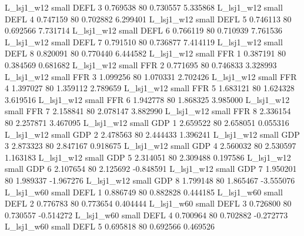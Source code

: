     L_lsj1_w12      small     DEFL                 3 0.769538 80       0.730557           5.335868
    L_lsj1_w12      small     DEFL                 4 0.747159 80       0.702882           6.299401
    L_lsj1_w12      small     DEFL                 5 0.746113 80       0.692566           7.731714
    L_lsj1_w12      small     DEFL                 6 0.766119 80       0.710939           7.761536
    L_lsj1_w12      small     DEFL                 7 0.791510 80       0.736877           7.414119
    L_lsj1_w12      small     DEFL                 8 0.820091 80       0.770440           6.444582
    L_lsj1_w12      small      FFR                 1 0.387191 80       0.384569           0.681682
    L_lsj1_w12      small      FFR                 2 0.771695 80       0.746833           3.328993
    L_lsj1_w12      small      FFR                 3 1.099256 80       1.070331           2.702426
    L_lsj1_w12      small      FFR                 4 1.397027 80       1.359112           2.789659
    L_lsj1_w12      small      FFR                 5 1.683121 80       1.624328           3.619516
    L_lsj1_w12      small      FFR                 6 1.942778 80       1.868325           3.985000
    L_lsj1_w12      small      FFR                 7 2.158841 80       2.078147           3.882990
    L_lsj1_w12      small      FFR                 8 2.336154 80       2.257871           3.467095
    L_lsj1_w12      small      GDP                 1 2.659522 80       2.658051           0.055316
    L_lsj1_w12      small      GDP                 2 2.478563 80       2.444433           1.396241
    L_lsj1_w12      small      GDP                 3 2.873323 80       2.847167           0.918675
    L_lsj1_w12      small      GDP                 4 2.560032 80       2.530597           1.163183
    L_lsj1_w12      small      GDP                 5 2.314051 80       2.309488           0.197586
    L_lsj1_w12      small      GDP                 6 2.107654 80       2.125692          -0.848591
    L_lsj1_w12      small      GDP                 7 1.950201 80       1.989337          -1.967276
    L_lsj1_w12      small      GDP                 8 1.799148 80       1.865467          -3.555076
    L_lsj1_w60      small     DEFL                 1 0.886749 80       0.882828           0.444185
    L_lsj1_w60      small     DEFL                 2 0.776783 80       0.773654           0.404444
    L_lsj1_w60      small     DEFL                 3 0.726800 80       0.730557          -0.514272
    L_lsj1_w60      small     DEFL                 4 0.700964 80       0.702882          -0.272773
    L_lsj1_w60      small     DEFL                 5 0.695818 80       0.692566           0.469526
